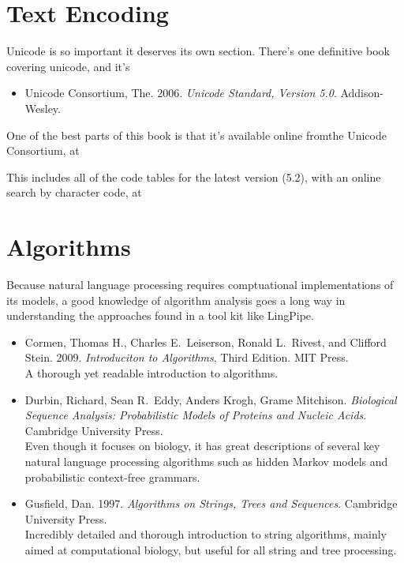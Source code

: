 \section{Text Encoding}

\noindent
Unicode is so important it deserves its own section.  There's one definitive
book covering unicode, and it's
%
\begin{itemize}
\item Unicode Consortium, The.  2006.
{\it Unicode Standard, Version 5.0}.
Addison-Wesley.
\end{itemize}
%
One of the best parts of this book is that it's available online fromthe
Unicode Consortium, at
%
\begin{quote}
\end{quote}
%
This includes all of the code tables for the latest version (5.2), with
an online search by character code, at
%
\begin{quote}
\end{quote}


\section{Algorithms}

\noindent
Because natural language processing requires comptuational
implementations of its models, a good knowledge of algorithm analysis
goes a long way in understanding the approaches found in a tool kit
like LingPipe.

\begin{itemize}
%
\item
Cormen, Thomas H., Charles E.\ Leiserson, Ronald L.\ Rivest, and
Clifford Stein. 
2009.
{\it Introduciton to Algorithms}, Third Edition.
MIT Press.
\\
{\footnotesize A thorough yet readable introduction to algorithms.}
%
\item
Durbin, Richard, Sean R.\ Eddy, Anders Krogh, Grame Mitchison.
{\it Biological Sequence Analysis: Probabilistic Models of Proteins
and Nucleic Acids}.
Cambridge University Press.
\\
{\footnotesize Even though it focuses on biology, it has great
descriptions of several key natural language processing algorithms
such as hidden Markov models and probabilistic context-free grammars.}
%
\item
Gusfield, Dan.
1997.
{\it Algorithms on Strings, Trees and Sequences}.
Cambridge University Press.
\\
{\footnotesize Incredibly detailed and thorough introduction to
string algorithms, mainly aimed at computational biology, but
useful for all string and tree processing.}
%
\end{itemize}






